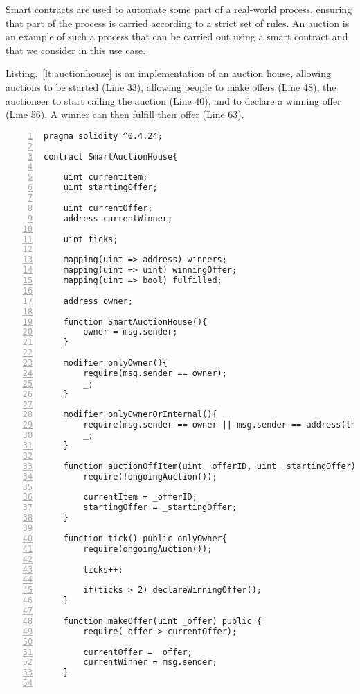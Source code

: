 \documentclass{article}
\begin{document}
 Smart contracts are used to automate some part of a real-world process, ensuring that part of the process is carried according to a strict set of rules. An auction is an example of such a process that can be carried out using a smart contract and that we consider in this use case.
 
 Listing.~\ref{lt:auctionhouse} is an implementation of an auction house, allowing auctions to be started (Line 33), allowing people to make offers (Line 48), the auctioneer to start calling the auction (Line 40), and to declare a winning offer (Line 56). A winner can then fulfill their offer (Line 63).
 
\small\begin{lstlisting}[language=DEA,basicstyle=\scriptsize,numbers=left,numbersep=2pt,xleftmargin=0.3cm,escapechar=\%,label={lt:auctionhouse},caption={A auction house smart contract.}]
pragma solidity ^0.4.24;

contract SmartAuctionHouse{

    uint currentItem;
    uint startingOffer;

    uint currentOffer;
    address currentWinner;

    uint ticks;

    mapping(uint => address) winners;
    mapping(uint => uint) winningOffer;
    mapping(uint => bool) fulfilled;

    address owner;

    function SmartAuctionHouse(){
        owner = msg.sender;
    }

    modifier onlyOwner(){
        require(msg.sender == owner);
        _;
    }
    
    modifier onlyOwnerOrInternal(){
        require(msg.sender == owner || msg.sender == address(this));
        _;
    }

    function auctionOffItem(uint _offerID, uint _startingOffer) public {
        require(!ongoingAuction());

        currentItem = _offerID;
        startingOffer = _startingOffer;
    }

    function tick() public onlyOwner{
        require(ongoingAuction());

        ticks++;

        if(ticks > 2) declareWinningOffer();
    }

    function makeOffer(uint _offer) public {
        require(_offer > currentOffer);

        currentOffer = _offer;
        currentWinner = msg.sender;
    }


\end{lstlisting}
\end{document}
